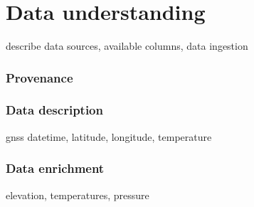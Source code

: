 
\chapter{Data understanding}

describe data sources, available columns, data ingestion

\subsection{Provenance}

\subsection{Data description}

gnss datetime, latitude, longitude, temperature

\subsection{Data enrichment}

elevation, temperatures, pressure
